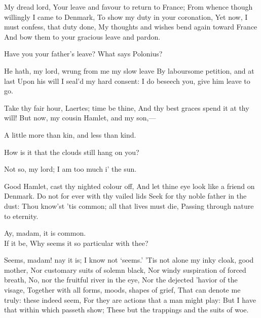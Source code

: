 \documentclass[11pt]{book}
\begin{document}
\7	My dread lord,
	Your leave and favour to return to France;
	From whence though willingly I came to Denmark,
	To show my duty in your coronation,
	Yet now, I must confess, that duty done,
	My thoughts and wishes bend again toward France
	And bow them to your gracious leave and pardon.

\2	Have you your father's leave? What says Polonius?

\5	He hath, my lord, wrung from me my slow leave
	By laboursome petition, and at last
	Upon his will I seal'd my hard consent:
	I do beseech you, give him leave to go.

\2	Take thy fair hour, Laertes; time be thine,
	And thy best graces spend it at thy will!
	But now, my cousin Hamlet, and my son,---

\aparte\1  A little more than kin, and less than kind.

\2	How is it that the clouds still hang on you?

\1	Not so, my lord; I am too much i' the sun.

\3	Good Hamlet, cast thy nighted colour off,
	And let thine eye look like a friend on Denmark.
	Do not for ever with thy vailed lids
	Seek for thy noble father in the dust:
	Thou know'st 'tis common; all that lives must die,
	Passing through nature to eternity.

\1	Ay, madam, it is common. \\

\3	If it be,
	Why seems it so particular with thee?

\1	Seems, madam! nay it is; I know not `seems.'
	'Tis not alone my inky cloak, good mother,
	Nor customary suits of solemn black,
	Nor windy suspiration of forced breath,
	No, nor the fruitful river in the eye,
	Nor the dejected 'havior of the visage,
	Together with all forms, moods, shapes of grief,
	That can denote me truly: these indeed seem,
	For they are actions that a man might play:
	But I have that within which passeth show;
	These but the trappings and the suits of woe.
\end{document}
